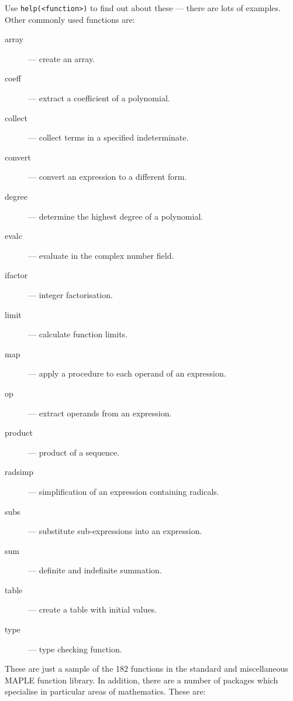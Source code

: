 Use \verb+help(<function>)+ to find out about these --- there are lots of
examples. Other commonly used functions are:

\begin{description}
\begin{description}

\item [array] --- create an array.
\item [coeff] --- extract a coefficient of a polynomial.
\item [collect] --- collect terms in a specified indeterminate.
\item [convert] --- convert an expression to a different form.
\item [degree] --- determine the highest degree of a polynomial.
\item [evalc] --- evaluate in the complex number field.
\item [ifactor] --- integer factorisation.
\item [limit] --- calculate function limits.
\item [map] --- apply a procedure to each operand of an expression.
\item [op] --- extract operands from an expression.
\item [product] --- product of a sequence.
\item [radsimp] --- simplification of an expression containing radicals.
\item [subs] --- substitute sub-expressions into an expression.
\item [sum] --- definite and indefinite summation.
\item [table] --- create a table with initial values.
\item [type] --- type checking function.

\end{description}
\end{description}

These are just a sample of the 182 functions in the standard and
miscellaneous MAPLE function library. In addition, there are a number of
packages which specialise in particular areas of mathematics. These are:


